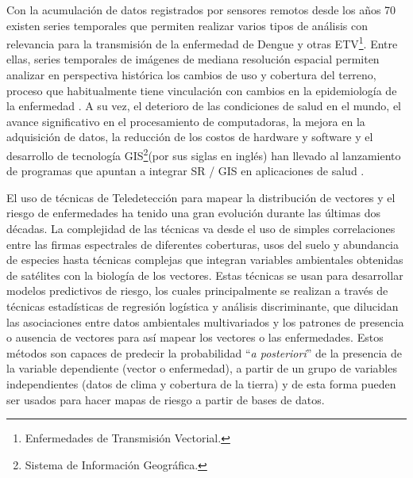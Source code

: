 \par Con la acumulación de datos registrados por sensores remotos desde los años
  70 existen series temporales que permiten realizar varios tipos de análisis con
  relevancia para la transmisión de la enfermedad de Dengue y otras
  ETV\footnote{Enfermedades de Transmisión Vectorial.}.
  Entre ellas, series temporales de imágenes de mediana resolución espacial
  permiten analizar en perspectiva histórica los cambios de uso y cobertura del
  terreno, proceso que habitualmente tiene vinculación con cambios en la
  epidemiología de la enfermedad \cite{german_temporal}.
  A su vez, el deterioro de las condiciones de salud en el mundo, el avance significativo
  en el procesamiento de computadoras, la mejora en la adquisición de datos,
  la reducción de los costos de hardware y software y el desarrollo de tecnología
  GIS\footnote{Sistema de Información Geográfica.}(por sus siglas en inglés) han llevado al lanzamiento
  de programas que apuntan a integrar SR / GIS en aplicaciones de salud
  \cite{tesis_riesgo_viral, tesis_gonza, espinosa_temporal, rs_public_health}.



\par El uso de técnicas de Teledetección para mapear la distribución de vectores y el riesgo
  de enfermedades ha tenido una gran evolución durante las últimas dos
  décadas. La complejidad de las técnicas va desde el uso de simples
  correlaciones entre las firmas espectrales de diferentes coberturas, usos del
  suelo y abundancia de especies hasta técnicas complejas que integran variables
  ambientales obtenidas de satélites con la biología de los vectores.
  Estas técnicas se usan para desarrollar modelos predictivos de riesgo,
  los cuales principalmente se realizan a través de técnicas estadísticas de
  regresión logística y análisis discriminante, que dilucidan las asociaciones
  entre datos ambientales multivariados y los patrones de presencia o ausencia de
  vectores para así mapear los vectores o las enfermedades.
  Estos métodos son capaces de predecir la probabilidad “\textit{a posteriori}” de la
  presencia de la variable dependiente (vector o enfermedad), a partir de un
  grupo de variables independientes (datos de clima y cobertura de la tierra) y de esta
  forma pueden ser usados para hacer mapas de riesgo a partir de bases de datos.



